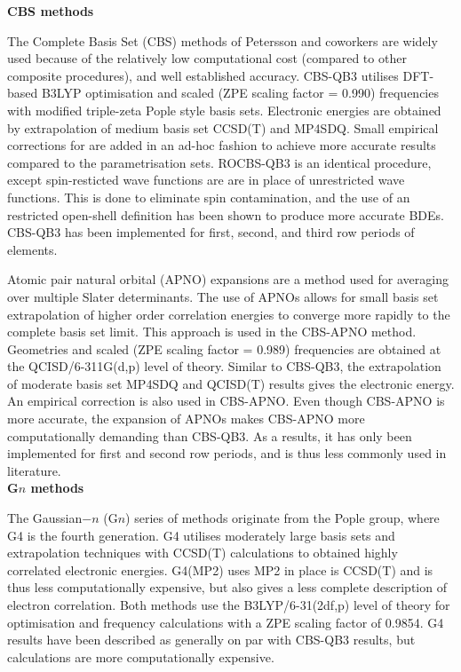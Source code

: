 \noindent \textbf{CBS methods}

The Complete Basis Set (CBS) methods of Petersson and coworkers\cite{Montgomery1999, Montgomery2000, Ochterski1996, Wood2006} are widely used because of the relatively low computational cost (compared to other composite procedures), and well established accuracy.\cite{Somers2015, Simmie2015} CBS-QB3\cite{Montgomery1999, Montgomery2000} utilises DFT-based B3LYP optimisation and scaled (ZPE scaling factor = 0.990) frequencies with modified triple-zeta Pople style basis sets. Electronic energies are obtained by extrapolation of medium basis set CCSD(T) and MP4SDQ. Small empirical corrections for are added in an ad-hoc fashion to achieve more accurate results compared to the parametrisation sets.\cite{Petersson2001} ROCBS-QB3 is an identical procedure, except spin-resticted wave functions are are in place of unrestricted wave functions. This is done to eliminate spin contamination, and the use of an restricted open-shell definition has been shown to produce more accurate BDEs.\cite{DiLabio1999} CBS-QB3 has been implemented for first, second, and third row periods of elements.

Atomic pair natural orbital (APNO) expansions are a method used for averaging over multiple Slater determinants. The use of APNOs allows for small basis set extrapolation of higher order correlation energies to converge more rapidly to the complete basis set limit. This approach is used in the CBS-APNO method.\cite{Ochterski1996} Geometries and scaled (ZPE scaling factor = 0.989) frequencies are obtained at the QCISD/6-311G(d,p) level of theory. Similar to CBS-QB3, the extrapolation of moderate basis set MP4SDQ and QCISD(T) results gives the electronic energy. An empirical correction is also used in CBS-APNO. Even though CBS-APNO is more accurate, the expansion of APNOs makes CBS-APNO more computationally demanding than CBS-QB3. As a results, it has only been implemented for first and second row periods, and is thus less commonly used in literature.
\\

\noindent \textbf{G$n$ methods}

The Gaussian$-n$ (G$n$) series of methods originate from the Pople group,\cite{Pople1989} where G4 is the fourth generation. G4 utilises moderately large basis sets and extrapolation techniques with CCSD(T) calculations to obtained highly correlated electronic energies. G4(MP2) uses MP2 in place is CCSD(T) and is thus less computationally expensive, but also gives a less complete description of electron correlation. Both methods use the B3LYP/6-31(2df,p) level of theory for optimisation and frequency calculations with a ZPE scaling factor of 0.9854. G4 results have been described as generally on par with CBS-QB3 results,\cite{Somers2015, Simmie2015} but calculations are more computationally expensive.


